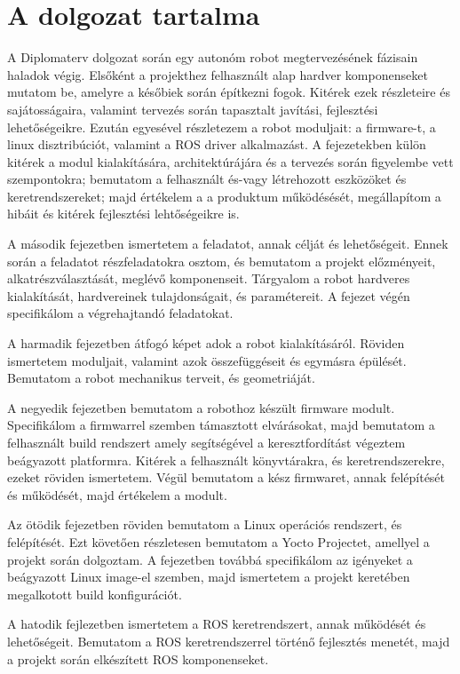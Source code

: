 \section{A dolgozat tartalma}

A Diplomaterv dolgozat során egy autonóm robot megtervezésének fázisain haladok
végig. Elsőként a projekthez felhasznált alap hardver komponenseket mutatom be,
amelyre a későbiek során építkezni fogok. Kitérek ezek részleteire és
sajátosságaira, valamint tervezés során tapasztalt javítási, fejlesztési
lehetőségeikre. Ezután egyesével részletezem a robot moduljait: a firmware-t, a
linux disztribúciót, valamint a ROS driver alkalmazást. A fejezetekben külön
kitérek a modul kialakítására, architektúrájára és a tervezés során figyelembe
vett szempontokra; bemutatom a felhasznált és-vagy létrehozott eszközöket és
keretrendszereket; majd értékelem a a produktum működésését, megállapítom a
hibáit és kitérek fejlesztési lehtőségeikre is.

A második fejezetben ismertetem a feladatot, annak célját és lehetőségeit. Ennek
során a feladatot részfeladatokra osztom, és bemutatom a projekt előzményeit,
alkatrészválasztását, meglévő komponenseit. Tárgyalom a robot hardveres
kialakítását, hardvereinek tulajdonságait, és paramétereit. A fejezet végén
specifikálom a végrehajtandó feladatokat.

A harmadik fejezetben átfogó képet adok a robot kialakításáról. Röviden
ismertetem moduljait, valamint azok összefüggéseit és egymásra
épülését. Bemutatom a robot mechanikus terveit, és geometriáját.

A negyedik fejezetben bemutatom a robothoz készült firmware modult. Specifikálom
a firmwarrel szemben támasztott elvárásokat, majd bemutatom a felhasznált build
rendszert amely segítségével a keresztfordítást végeztem beágyazott
platformra. Kitérek a felhasznált könyvtárakra, és keretrendszerekre, ezeket
röviden ismertetem. Végül bemutatom a kész firmwaret, annak felépítését és
működését, majd értékelem a modult.

Az ötödik fejezetben röviden bemutatom a Linux operációs rendszert, és
felépítését. Ezt követően részletesen bemutatom a Yocto Projectet, amellyel a
projekt során dolgoztam. A fejezetben továbbá specifikálom az igényeket a
beágyazott Linux image-el szemben, majd ismertetem a projekt keretében
megalkotott build konfigurációt.

A hatodik fejlezetben ismertetem a ROS keretrendszert, annak működését és
lehetőségeit. Bemutatom a ROS keretrendszerrel történő fejlesztés menetét, majd a
projekt során elkészített ROS komponenseket.


